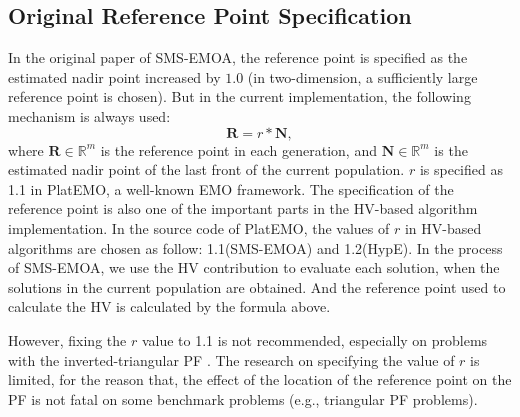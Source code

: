 \documentclass[conference]{IEEEtran}
\begin{document}
\subsection{Original Reference Point Specification}
In the original paper of SMS-EMOA\cite{smsemoa}, 
the reference point is specified as the estimated nadir point increased by $\boldsymbol{1.0}$
(in two-dimension, a sufficiently large reference point is chosen). 
But in the current implementation, the following mechanism is always used:
\begin{equation}\label{frpa1}
  \boldsymbol R = r * \boldsymbol N,  
\end{equation}
where $\boldsymbol R \in \mathbb{R}^m$ is the reference point in each generation, 
and $\boldsymbol N \in \mathbb{R}^m$ is the estimated nadir point of the last front of the current population. 
$r$ is specified as 1.1 in PlatEMO\cite{PlatEMO}, a well-known EMO framework. 
The specification of the reference point is also one of the important parts in the HV-based algorithm implementation.
In the source code of PlatEMO, the values of $r$ in HV-based algorithms are chosen as follow: 
1.1(SMS-EMOA\cite{smsemoa}) and 1.2(HypE\cite{HypE}). %
In the process of SMS-EMOA,  
we use the HV contribution to evaluate each solution, when the solutions in the current population are obtained. 
And the reference point used to calculate the HV is calculated by the formula above. 

However, fixing the $r$ value to 1.1 is not recommended, especially on problems with the inverted-triangular PF
\cite{hisao:RPhowtoSpecify}. 
The research on specifying the value of $r$ is limited, for the reason that, 
the effect of the location of the reference point on the PF 
is not fatal on some benchmark problems (e.g., triangular PF problems). 

%
\end{document}

